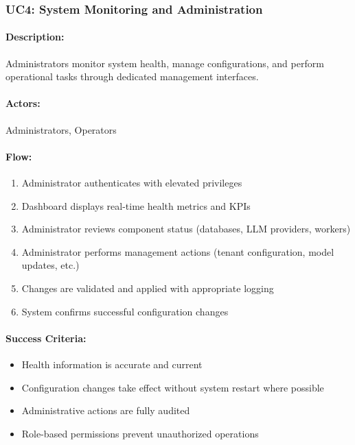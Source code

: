 \subsubsection{UC4: System Monitoring and Administration}

\paragraph{Description:} Administrators monitor system health, manage configurations, and perform operational tasks through dedicated management interfaces.

\paragraph{Actors:} Administrators, Operators

\paragraph{Flow:}
\begin{enumerate}
    \item Administrator authenticates with elevated privileges
    \item Dashboard displays real-time health metrics and KPIs
    \item Administrator reviews component status (databases, LLM providers, workers)
    \item Administrator performs management actions (tenant configuration, model updates, etc.)
    \item Changes are validated and applied with appropriate logging
    \item System confirms successful configuration changes
\end{enumerate}

\paragraph{Success Criteria:}
\begin{itemize}
    \item Health information is accurate and current
    \item Configuration changes take effect without system restart where possible
    \item Administrative actions are fully audited
    \item Role-based permissions prevent unauthorized operations
\end{itemize}

